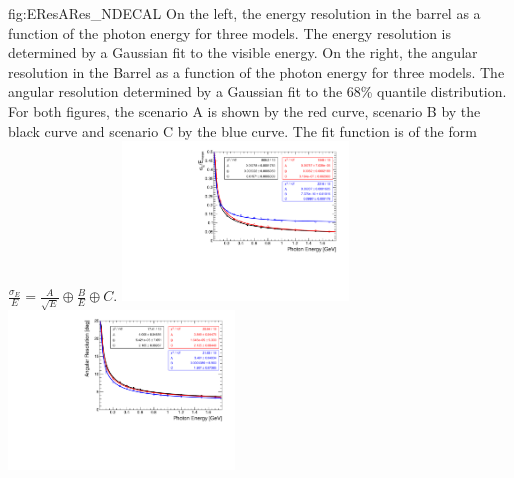 \begin{dunefigure}{fig:EResARes_NDECAL}
{On the left, the energy resolution in the barrel as a function of the photon energy for three  models. The energy resolution is determined by a Gaussian fit to the visible energy. On the right, the angular resolution in the Barrel as a function of the photon energy for three  models. The angular resolution determined by a Gaussian fit to the 68\% quantile distribution. For both figures, the scenario A is shown by the red curve, scenario B by the black curve and scenario C by the blue curve. The fit function is of the form $\frac{\sigma_{E}}{E} = \frac{A}{\sqrt{E}} \oplus \frac{B}{E} \oplus C$.}
\includegraphics[width=0.45\textwidth]{graphics/Comparison_Setups_EnergyResolution.pdf}
\includegraphics[width=0.45\textwidth]{graphics/Comparison_Setups_AngularResolution.pdf}
\end{dunefigure}



